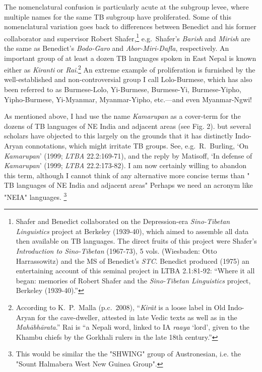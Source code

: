 The nomenclatural confusion is particularly acute at the subgroup levee, where multiple names for the same TB subgroup have proliferated.
Some of this nomenclatural variation goes back
to differences between Benedict and his former collaborator and supervisor
Robert Shafer,\footnote{Shafer and Benedict collaborated on the Depression-era
\textit{Sino-Tibetan Linguistics} project at Berkeley (1939-40), which aimed to assemble
all data then available on TB languages.  The direct fruits of this project were
Shafer’s \textit{Introduction to Sino-Tibetan} (1967-73), 5 vols. (Wiesbaden: Otto
Harrassowitz) and the MS of Benedict’s \textit{STC}.  Benedict produced (1975) an
entertaining account of this seminal project in LTBA 2.1:81-92: “Where it all
began: memories of Robert Shafer and the \textit{Sino-Tibetan Linguistics} project,
Berkeley (1939-40).”} e.g.\ Shafer’s \textit{Barish} and \textit{Mirish} are the same as Benedict’s
\textit{Bodo-Garo} and \textit{Abor-Miri-Dafla}, respectively.  An important group of at least a
dozen TB languages spoken in East Nepal is known either as \textit{Kiranti} or
\textit{Rai}.\footnote{According to K.~P.~Malla (p.c.~2008), “\textit{Kirãt} is a loose label in Old Indo-Aryan for the cave-dweller, attested in late Vedic texts as well as in the \textit{Mahābhārata}.” Rai is “a Nepali word, linked to IA \textit{raaya} ‘lord’, given to the Khambu chiefs by the Gorkhali rulers in the late 18th century.”}
  An extreme example of proliferation is furnished by the well-established and
non-controversial group I call Lolo-Burmese, which has also been referred to as
Burmese-Lolo, Yi-Burmese, Burmese-Yi, Burmese-Yipho, Yipho-Burmese, Yi-Myanmar,
Myanmar-Yipho, etc.—and even Myanmar-Ngwi!

As mentioned above, I had use the name \textit{Kamarupan} as a cover-term for the dozens of TB languages of NE India and adjacent areas (see Fig. 2). but several scholars have objected to this
largely on the grounds that it has distinctly Indo-Aryan connotations, which
might irritate TB groups.  See, e.g.\ R.~Burling, ‘On \textit{Kamarupan}’ (1999; \textit{LTBA}
22.2:169-71), and the reply by Matisoff, ‘In defense of \textit{Kamarupan}’
(1999; \textit{LTBA} 22.2:173-82).  
I am now certainly willing to abandon this term, although I cannot think of any alternative more concise terms than " TB languages of NE India and adjacent areas"  Perhaps we need an acronym like "NEIA" languages. \footnote{This would be similar the the "SHWING" group of Austronesian, i.e. the "Sount Halmabera West New Guinea Group".}

